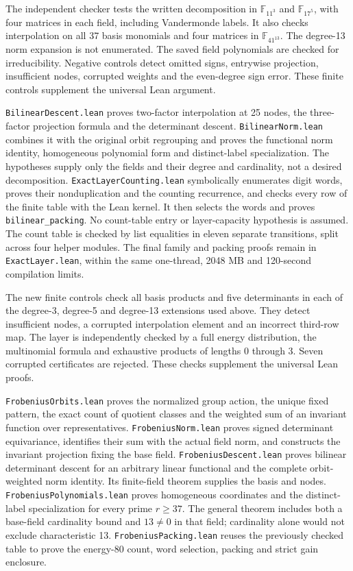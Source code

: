\documentclass[11pt]{article}
\begin{document}
The independent checker tests the written decomposition in
\(\mathbb F_{11^3}\) and \(\mathbb F_{17^5}\), with four matrices in each
field, including Vandermonde labels. It also checks interpolation on
all 37 basis monomials and four matrices in \(\mathbb F_{41^{13}}\).
The degree-13 norm expansion is not enumerated. The saved field
polynomials are checked for irreducibility. Negative controls detect
omitted signs, entrywise projection, insufficient nodes, corrupted
weights and the even-degree sign error. These finite controls supplement
the universal Lean argument.

\texttt{BilinearDescent.lean} proves two-factor interpolation at 25
nodes, the three-factor projection formula and the determinant descent.
\texttt{BilinearNorm.lean} combines it with the original orbit
regrouping and proves the functional norm identity, homogeneous
polynomial form and distinct-label specialization. The hypotheses
supply only the fields and their degree and cardinality, not a desired
decomposition. \texttt{ExactLayerCounting.lean} symbolically enumerates digit
words, proves their nonduplication and the counting recurrence, and
checks every row of the finite table with the Lean kernel. It then
selects the words and proves \texttt{bilinear\_packing}. No count-table
entry or layer-capacity hypothesis is assumed. The count table is
checked by list equalities in eleven separate transitions, split across
four helper modules. The final family and packing proofs remain in
\texttt{ExactLayer.lean}, within
the same one-thread, 2048 MB and 120-second compilation limits.

The new finite controls check all basis products and five determinants
in each of the degree-3, degree-5 and degree-13 extensions used above.
They detect insufficient nodes, a corrupted interpolation element and
an incorrect third-row map. The layer is independently checked by a
full energy distribution, the multinomial formula and exhaustive
products of lengths 0 through 3. Seven corrupted certificates are
rejected. These checks supplement the universal Lean proofs.

\texttt{FrobeniusOrbits.lean} proves the normalized group action,
the unique fixed pattern, the exact count of quotient classes and
the weighted sum of an invariant function over representatives.
\texttt{FrobeniusNorm.lean} proves signed determinant equivariance,
identifies their sum with the actual field norm, and constructs the
invariant projection fixing the base field.
\texttt{FrobeniusDescent.lean} proves bilinear determinant descent for
an arbitrary linear functional and the complete orbit-weighted norm
identity. Its finite-field theorem supplies the basis and nodes.
\texttt{FrobeniusPolynomials.lean} proves homogeneous coordinates and
the distinct-label specialization for every prime \(r\ge37\).
The general theorem includes both a base-field cardinality bound and
\(13\ne0\) in that field; cardinality alone would not exclude
characteristic 13. \texttt{FrobeniusPacking.lean} reuses the previously
checked table to prove the energy-80 count, word selection, packing
and strict gain enclosure.
\end{document}
